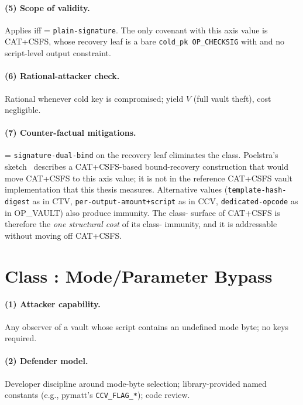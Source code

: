 \paragraph{(5) Scope of validity.}
Applies iff \axrecbind{} = \texttt{plain-signature}. The only
covenant with this axis value is CAT+CSFS, whose recovery leaf is a
bare \texttt{cold\_pk OP\_CHECKSIG} with  and no
script-level output constraint.

\paragraph{(6) Rational-attacker check.}
Rational whenever cold key is compromised; yield $V$ (full vault
theft), cost negligible.

\paragraph{(7) Counter-factual mitigations.}
\axrecbind{} = \texttt{signature-dual-bind} on the recovery leaf
eliminates the class. Poelstra's sketch~\cite{Poe21} describes a
CAT+CSFS-based bound-recovery construction that would move CAT+CSFS
to this axis value; it is not in the reference CAT+CSFS vault
implementation that this thesis measures. Alternative \axrecbind{}
values (\texttt{template-hash-digest} as in CTV,
\texttt{per-output-amount+script} as in CCV,
\texttt{dedicated-opcode} as in OP\_VAULT) also produce immunity.
The class-\classcold{} surface of CAT+CSFS is therefore the
\emph{one structural cost} of its class-\classhot{} immunity, and
it is addressable without moving off CAT+CSFS.

\section{Class \classmode{}: Mode/Parameter Bypass}
\label{app:rat:classmode}

\paragraph{(1) Attacker capability.}
Any observer of a vault whose script contains an undefined mode
byte; no keys required.

\paragraph{(2) Defender model.}
Developer discipline around mode-byte selection; library-provided
named constants (e.g., pymatt's \texttt{CCV\_FLAG\_*}); code review.

